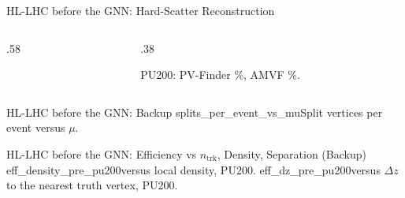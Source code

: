 \begin{frame}{HL-LHC before the GNN: Hard-Scatter Reconstruction}
\mainbadge
\begin{columns}[T]
\begin{column}{.58\linewidth}\centering
{}
\end{column}
\begin{column}{.38\linewidth}
\small
{}
\par\vspace{.6em}
PU200: PV-Finder \hsRecoPVF\%, AMVF \hsRecoAMVF\%.
\end{column}
\end{columns}
\end{frame}

\begin{frame}{HL-LHC before the GNN: Backup}
\backupbadge
{}%
{splits_per_event_vs_mu}{Split vertices per event versus $\mu$.}
\end{frame}

\begin{frame}{HL-LHC before the GNN: Efficiency vs $n_\mathrm{trk}$, Density, Separation (Backup)}
\backupbadge
{}%
{eff_density_pre_pu200}{versus local density, PU200.}%
{eff_dz_pre_pu200}{versus $\Delta z$ to the nearest truth vertex, PU200.}
\end{frame}

